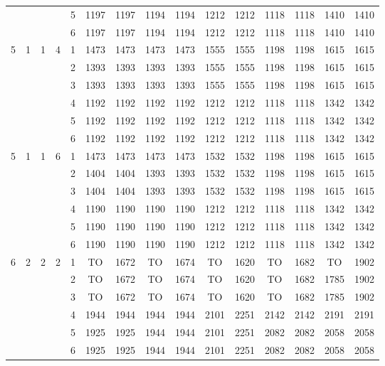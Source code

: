 \begin{longtable}{|c|c|c|c|c|c c|c c|c c|c c|c c|}
 & & & & 5 & 1197 & 1197 & 1194 & 1194 & 1212 & 1212 & 1118 & 1118 & 1410 & 1410 \\
 & & & & 6 & 1197 & 1197 & 1194 & 1194 & 1212 & 1212 & 1118 & 1118 & 1410 & 1410 \\
\hline
\multirow{6}{*}{5} & \multirow{6}{*}{1} & \multirow{6}{*}{1} & \multirow{6}{*}{4} & 1 & 1473 & 1473 & 1473 & 1473 & 1555 & 1555 & 1198 & 1198 & 1615 & 1615 \\
 & & & & 2 & 1393 & 1393 & 1393 & 1393 & 1555 & 1555 & 1198 & 1198 & 1615 & 1615 \\
 & & & & 3 & 1393 & 1393 & 1393 & 1393 & 1555 & 1555 & 1198 & 1198 & 1615 & 1615 \\
 & & & & 4 & 1192 & 1192 & 1192 & 1192 & 1212 & 1212 & 1118 & 1118 & 1342 & 1342 \\
 & & & & 5 & 1192 & 1192 & 1192 & 1192 & 1212 & 1212 & 1118 & 1118 & 1342 & 1342 \\
 & & & & 6 & 1192 & 1192 & 1192 & 1192 & 1212 & 1212 & 1118 & 1118 & 1342 & 1342 \\
\hline
\multirow{6}{*}{5} & \multirow{6}{*}{1} & \multirow{6}{*}{1} & \multirow{6}{*}{6} & 1 & 1473 & 1473 & 1473 & 1473 & 1532 & 1532 & 1198 & 1198 & 1615 & 1615 \\
 & & & & 2 & 1404 & 1404 & 1393 & 1393 & 1532 & 1532 & 1198 & 1198 & 1615 & 1615 \\
 & & & & 3 & 1404 & 1404 & 1393 & 1393 & 1532 & 1532 & 1198 & 1198 & 1615 & 1615 \\
 & & & & 4 & 1190 & 1190 & 1190 & 1190 & 1212 & 1212 & 1118 & 1118 & 1342 & 1342 \\
 & & & & 5 & 1190 & 1190 & 1190 & 1190 & 1212 & 1212 & 1118 & 1118 & 1342 & 1342 \\
 & & & & 6 & 1190 & 1190 & 1190 & 1190 & 1212 & 1212 & 1118 & 1118 & 1342 & 1342 \\
\hline
\multirow{6}{*}{6} & \multirow{6}{*}{2} & \multirow{6}{*}{2} & \multirow{6}{*}{2} & 1 & TO & 1672 & TO & 1674 & TO & 1620 & TO & 1682 & TO & 1902 \\
 & & & & 2 & TO & 1672 & TO & 1674 & TO & 1620 & TO & 1682 & 1785 & 1902 \\
 & & & & 3 & TO & 1672 & TO & 1674 & TO & 1620 & TO & 1682 & 1785 & 1902 \\
 & & & & 4 & 1944 & 1944 & 1944 & 1944 & 2101 & 2251 & 2142 & 2142 & 2191 & 2191 \\
 & & & & 5 & 1925 & 1925 & 1944 & 1944 & 2101 & 2251 & 2082 & 2082 & 2058 & 2058 \\
 & & & & 6 & 1925 & 1925 & 1944 & 1944 & 2101 & 2251 & 2082 & 2082 & 2058 & 2058 \\

\end{longtable}
